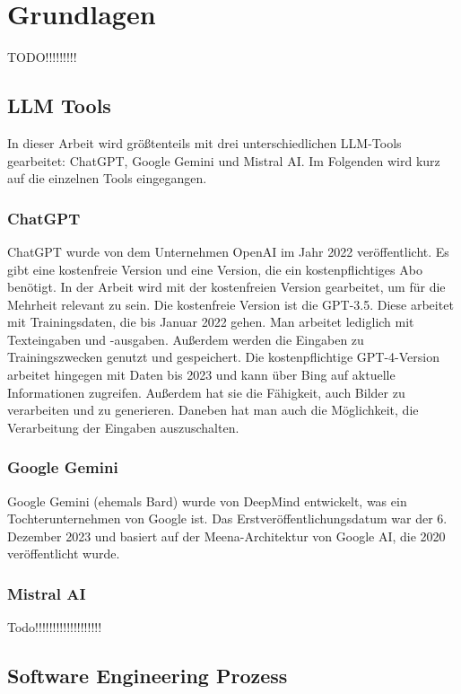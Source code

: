 
\chapter{Grundlagen} 

TODO!!!!!!!!!

\section{LLM Tools}  \label{LLM Tools}

In dieser Arbeit wird größtenteils mit drei unterschiedlichen LLM-Tools gearbeitet: ChatGPT, Google Gemini und  
Mistral AI. Im Folgenden wird kurz auf die einzelnen Tools eingegangen.

\subsection{ChatGPT}  \label{ChatGPT}

ChatGPT wurde von dem Unternehmen OpenAI im Jahr 2022 veröffentlicht. Es gibt eine kostenfreie Version und  
eine Version, die ein kostenpflichtiges Abo benötigt. In der Arbeit wird mit der kostenfreien Version gearbeitet,  
um für die Mehrheit relevant zu sein. Die kostenfreie Version ist die GPT-3.5. Diese arbeitet mit Trainingsdaten,  
die bis Januar 2022 gehen. Man arbeitet lediglich mit Texteingaben und -ausgaben. Außerdem werden die Eingaben  
zu Trainingszwecken genutzt und gespeichert. Die kostenpflichtige GPT-4-Version arbeitet hingegen mit Daten  
bis 2023 und kann über Bing auf aktuelle Informationen zugreifen. Außerdem hat sie die Fähigkeit, auch Bilder  
zu verarbeiten und zu generieren. Daneben hat man auch die Möglichkeit, die Verarbeitung der Eingaben auszuschalten. 

\subsection{Google Gemini}  \label{Google Gemini}

Google Gemini (ehemals Bard) wurde von DeepMind entwickelt, was ein Tochterunternehmen von Google ist.  
Das Erstveröffentlichungsdatum war der 6. Dezember 2023 und basiert auf der Meena-Architektur von Google AI,  
die 2020 veröffentlicht wurde.

\subsection{Mistral AI}  \label{Mistral AI}

Todo!!!!!!!!!!!!!!!!!!!

\section{Software Engineering Prozess}
